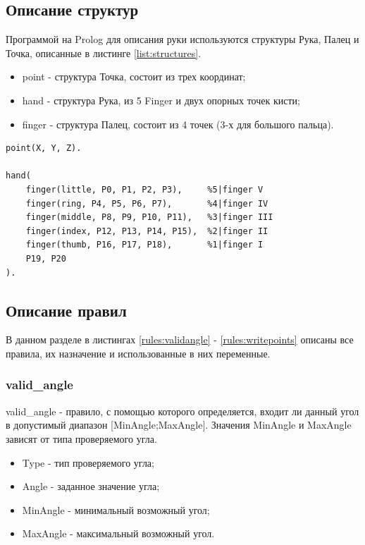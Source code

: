 \subsection{Описание структур}
\hspace{0.6cm} Программой на Prolog для описания руки используются структуры Рука, Палец и Точка, описанные в листинге \ref{list:structures}.

\begin{itemize}
	\item point - структура Точка, состоит из трех координат;
	\item hand - структура Рука, из 5 Finger и двух опорных точек кисти;
	\item finger - структура Палец, состоит из 4 точек (3-х для большого пальца).
\end{itemize}
\begin{lstlisting}[caption=Структуры, label=list:structures]
point(X, Y, Z).

hand(
	finger(little, P0, P1, P2, P3),		%5|finger V
	finger(ring, P4, P5, P6, P7),		%4|finger IV
	finger(middle, P8, P9, P10, P11),	%3|finger III
	finger(index, P12, P13, P14, P15),	%2|finger II
	finger(thumb, P16, P17, P18),		%1|finger I
	P19, P20							
).	
\end{lstlisting}

\newpage

\subsection{Описание правил}
\hspace{0.6cm} В данном разделе в листингах \ref{rules:validangle} - \ref{rules:writepoints} описаны все правила, их назначение и использованные в них переменные.

\subsubsection{valid\_angle}
\hspace{0.6cm} valid\_angle - правило, с помощью которого определяется, входит ли данный угол в допустимый диапазон [MinAngle;MaxAngle]. Значения MinAngle и MaxAngle зависят от типа проверяемого угла.

\begin{itemize}
	\item Type - тип проверяемого угла;
	\item Angle - заданное значение угла;
	\item MinAngle - минимальный возможный угол;
	\item MaxAngle - максимальный возможный угол.
\end{itemize}

